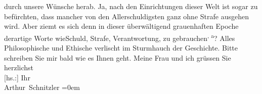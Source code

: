 \begin{ledgroupsized}[t]{13cm}
               durch unsere Wünsche herab. Ja, nach den Einrichtungen dieser Welt ist sogar zu
               befürchten, dass mancher von den Allerschuldigsten ganz ohne Strafe ausgehen wird.
               Aber ziemt es sich \introOben{}denn\introOben{} in dieser überwältigend grauenhaften
               Epoche derartige Worte \introOben{}wie\introOben{}{ }Schuld, Strafe, Verantwortung, zu gebrauchen\substVorne{}\textsuperscript{, a}\substDazwischen{}? A\substHinten{}lles Philosophische und Ethische verlischt im Sturmhauch der Geschichte.\pend
           \pstart
           Bitte schreiben Sie mir bald wie es Ihnen geht. Meine Frau und ich grüssen Sie herzlichst{\\[\baselineskip]}{[}hs.:{]} Ihr{\\[\baselineskip]}\spacefill\mbox{Arthur Schnitzler}\pend
           \leftskip=0em{}
         
         \endnumbering{}\end{ledgroupsized}  \newcommand{\dateiname}{L02199}\newcommand{\titel}{Arthur Schnitzler an Georg Brandes, 20. 10. 1914}\newcommand{\editorInnen}{Martin Anton Müller und Gerd-Hermann Susen}
      